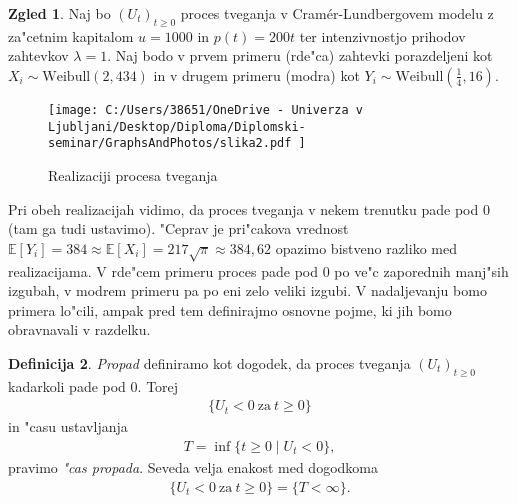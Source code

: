 \documentclass[12pt, a4paper, reqno]{amsart}
\theoremstyle{definition}
\newtheorem{definicija}{Definicija}[section]
\newtheorem{zgled}[definicija]{Zgled}
\theoremstyle{plain}
\newcommand{\E}{\mathbb{E}}
\newcommand{\1}{\mathds{1}}
\begin{document}
        \begin{zgled}
            Naj bo $(U_t)_{t\geq0}$ proces tveganja v Cramér-Lundbergovem modelu z za"cetnim kapitalom
            $u = 1000$ in $p(t) = 200t$ ter intenzivnostjo prihodov zahtevkov $\lambda=1$. %
            Naj bodo v prvem primeru (rde"ca) 
            zahtevki porazdeljeni kot $X_i \sim \text{Weibull}(2, 434)$ in v drugem primeru (modra) kot
            $Y_i \sim \text{Weibull}(\tfrac{1}{4}, 16)$.
            
            \begin{figure}[H]
                \centering
                \texttt{[image: 
                    C:/Users/38651/OneDrive - Univerza v Ljubljani/Desktop/Diploma/Diplomski-seminar/GraphsAndPhotos/slika2.pdf
                    ]}
                \caption{Realizaciji procesa tveganja}
                \label{fig:slika3}
            \end{figure}

            Pri obeh realizacijah vidimo, da proces tveganja v nekem trenutku pade pod $0$ (tam ga 
            tudi ustavimo). "Ceprav je pri"cakova vrednost 
            $\E\left[Y_i\right] = 384 \approx \E\left[X_i\right] = 217\sqrt{\pi} \approx 384,62$ 
            opazimo bistveno razliko med realizacijama. V rde"cem primeru proces pade pod
            $0$ po ve"c zaporednih manj"sih izgubah, v modrem primeru pa po eni zelo veliki izgubi. 
            V nadaljevanju bomo primera lo"cili, ampak pred tem 
            definirajmo osnovne pojme, ki jih bomo obravnavali v razdelku.

            \label{zgd:weibullProcesTveganja}
        \end{zgled}

        \begin{definicija}
            \textit{Propad} definiramo kot dogodek, da proces tveganja $(U_t)_{t\geq0}$ kadarkoli pade pod $0$. 
            Torej 
            \begin{align*}
                \bigl\{U_t<0 \ \text{za} \ t\geq 0\bigr\}
            \end{align*}
            in "casu ustavljanja
            \begin{align*}
                T = \inf\{t\geq0 \mid U_t < 0\}, 
            \end{align*}
            pravimo \textit{"cas propada}. Seveda velja enakost med dogodkoma
            \begin{align*}
                \{U_t<0 \ \text{za} \ t\geq0\} = \{T<\infty\}.
            \end{align*}
            \label{def:PropadCasPropada} 
        \end{definicija}
\end{document}
